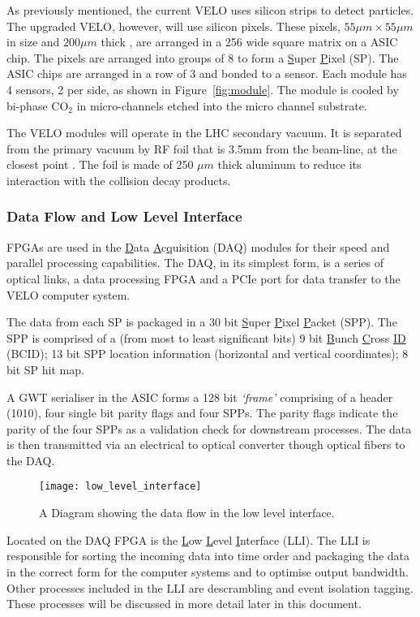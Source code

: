       As previously mentioned, the current VELO uses silicon strips to detect particles.
      The upgraded VELO, however, will use silicon pixels.
      These pixels, $55 \mu m \times 55 \mu m$ in size and $200 \mu m$ thick \cite{velo_design_report}, are arranged in a 256 wide square matrix on a ASIC chip.
      The pixels are arranged into groups of 8 to form a \underline{S}uper \underline{P}ixel (SP).
      The ASIC chips are arranged in a row of 3 and bonded to a sensor.
      Each module has 4 sensors, 2 per side, as shown in Figure~\ref{fig:module}. 
      The module is cooled by bi-phase CO$_2$ in micro-channels etched into the micro channel substrate. \cite{velo_design_report}
      \par
      The VELO modules will operate in the LHC secondary vacuum.
      It is separated from the primary vacuum by RF foil that is 3.5mm from the beam-line, at the closest point \cite{velo_design_report}.
      The foil is made of 250 $\mu m$ thick aluminum to reduce its interaction with the collision decay products. 

      \subsubsection{Data Flow and Low Level Interface}   

      FPGAs are used in the \underline{D}ata \underline{A}c\underline{q}uisition (DAQ) modules for their speed and parallel processing capabilities.
      The DAQ, in its simplest form, is a series of optical links, a data processing FPGA and a PCIe port for data transfer to the VELO computer system.
      \par
      The data from each SP is packaged in a 30 bit \underline{S}uper \underline{P}ixel \underline{P}acket (SPP). The SPP is comprised of  a (from most to least significant bits) 9 bit \underline{B}unch \underline{C}ross \underline{ID} (BCID); 13 bit SPP location information (horizontal and vertical coordinates); 8 bit SP hit map.
      \par
      A GWT serialiser in the ASIC forms a 128 bit \textit{`frame'} comprising of a header (1010), four single bit parity flags and four SPPs.
      The parity flags indicate the parity of the four SPPs as a validation check for downstream processes.
      The data is then transmitted via an electrical to optical converter though optical fibers to the DAQ.
      \begin{figure}[ht]
        \centering
        \texttt{[image: low\_level\_interface]}
        \caption{A Diagram showing the data flow in the low level interface.}
        \label{fig:lli}
      \end{figure}
      Located on the DAQ FPGA is the \underline{L}ow \underline{L}evel \underline{I}nterface (LLI).
      The LLI is responsible for sorting the incoming data into time order and packaging the data in the correct form for the computer systems and to optimise output bandwidth.
      Other processes included in the LLI are descrambling and event isolation tagging.
      These processes will be discussed in more detail later in this document.
